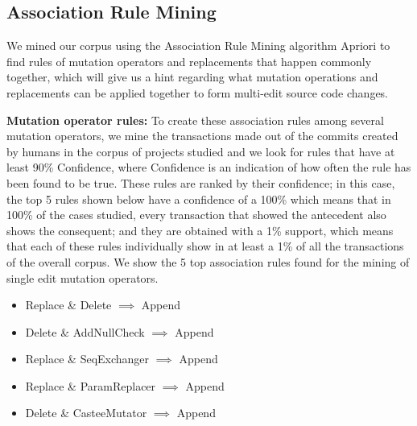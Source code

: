 \documentclass[conference]{IEEEtran}
\begin{document}
\subsection{Association Rule Mining} \label{armRes}

We mined our corpus using the Association Rule Mining algorithm Apriori 
to find rules of mutation operators and 
replacements that happen commonly together, which will give us a hint regarding
what mutation operations and replacements can be applied together to form multi-edit
source code changes.

\textbf{Mutation operator rules:}
To create these association rules among several mutation operators, we mine the
transactions made out of the commits created by humans in the corpus of projects
studied and we look for rules that have at least 90\% Confidence, where
Confidence is an indication of how often the rule has been found to be true.  
These rules are ranked by their confidence; in this case, the top 5 rules shown
below have a confidence of a 100\% which means that in 100\% of the cases
studied, every transaction that showed the antecedent also shows the consequent;
and they are obtained with a 1\% support, which means that each of these rules
individually show in at least a 1\% of all the transactions of the overall
corpus. We show the 5  top association rules found for the mining of single edit
mutation operators. 


\begin{itemize}
\item Replace \& Delete $\implies$ Append
\item Delete \& AddNullCheck $\implies$ Append
\item Replace \& SeqExchanger $\implies$ Append
\item Replace \& ParamReplacer $\implies$ Append
\item Delete \& CasteeMutator $\implies$ Append
\end{itemize}
\end{document}
